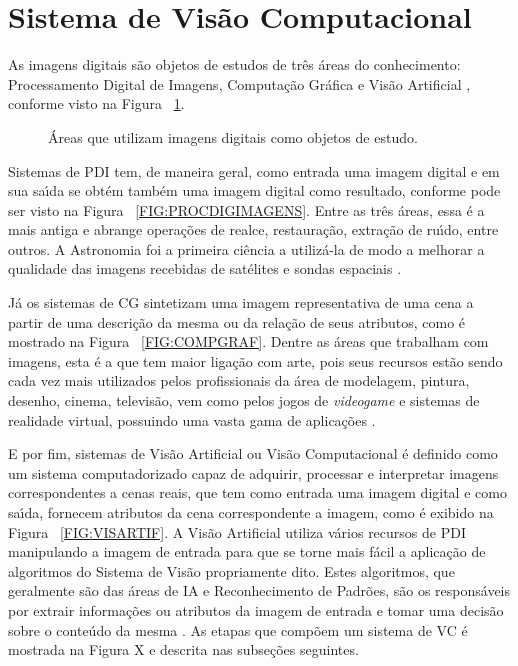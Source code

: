 \section{Sistema de Vis\~{a}o Computacional}

As imagens digitais s\~{a}o objetos de estudos de tr\^{e}s \'{a}reas do conhecimento: Processamento Digital de Imagens, Computa\c{c}\~{a}o Gr\'{a}fica e Vis\~{a}o Artificial \cite{AUZUIR:2005}, conforme visto na Figura ~\ref{FIG:AREASIMAGEMDIGITAL}.

\begin{figure}[h]
\centering
{}
\caption{\'{A}reas que utilizam imagens digitais como objetos de estudo.}\label{FIG:AREASIMAGEMDIGITAL}
\end{figure}

Sistemas de \ac{PDI} tem, de maneira geral, como entrada uma imagem digital e em sua sa\'{\i}da se obt\'{e}m tamb\'{e}m uma imagem digital como resultado, conforme pode ser visto na Figura ~\ref{FIG:PROCDIGIMAGENS}. Entre as tr\^{e}s \'{a}reas, essa \'{e} a mais antiga e abrange opera\c{c}\~{o}es de realce, restaura\c{c}\~{a}o, extra\c{c}\~{a}o de ru\'{\i}do, entre outros. A Astronomia foi a primeira ci\^{e}ncia a utiliz\'{a}-la de modo a melhorar a qualidade das imagens recebidas de sat\'{e}lites e sondas espaciais \cite{HEIDJEN:1995}.

J\'{a} os sistemas de \ac{CG} sintetizam uma imagem representativa de uma cena a partir de uma descri\c{c}\~{a}o da mesma ou da rela\c{c}\~{a}o de seus atributos, como \'{e} mostrado na Figura ~\ref{FIG:COMPGRAF}. Dentre as \'{a}reas que trabalham com imagens, esta \'{e} a que tem maior liga\c{c}\~{a}o com arte, pois seus recursos est\~{a}o sendo cada vez mais utilizados pelos profissionais da \'{a}rea de modelagem, pintura, desenho, cinema, televis\~{a}o, vem como pelos jogos de \emph{videogame} e sistemas de realidade virtual, possuindo uma vasta gama de aplica\c{c}\~{o}es \cite{HEIDJEN:1995}.

E por fim, sistemas de Vis\~{a}o Artificial ou Vis\~{a}o Computacional \'{e} definido como um sistema computadorizado capaz de adquirir, processar e interpretar imagens correspondentes a cenas reais, que tem como entrada uma imagem digital e como sa\'{\i}da, fornecem atributos da cena correspondente a imagem, como \'{e} exibido na Figura ~\ref{FIG:VISARTIF}. A Vis\~{a}o Artificial utiliza v\'{a}rios recursos de \ac{PDI} manipulando a imagem de entrada para que se torne mais f\'{a}cil a aplica\c{c}\~{a}o de algoritmos do Sistema de Vis\~{a}o propriamente dito. Estes algoritmos, que geralmente s\~{a}o das \'{a}reas de \ac{IA} e Reconhecimento de Padr\~{o}es, s\~{a}o os respons\'{a}veis por extrair informa\c{c}\~{o}es ou atributos da imagem de entrada e tomar uma decis\~{a}o sobre o conte\'{u}do da mesma \cite{HEIDJEN:1995}\cite{AUZUIR:2005}. As etapas que comp\~{o}em um sistema de \ac{VC} \'{e} mostrada na Figura X e descrita nas subse\c{c}\~{o}es seguintes.

